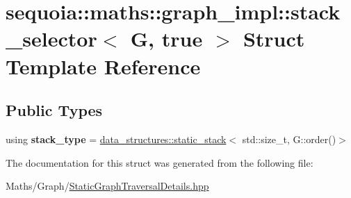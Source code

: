 \hypertarget{structsequoia_1_1maths_1_1graph__impl_1_1stack__selector_3_01_g_00_01true_01_4}{}\section{sequoia\+::maths\+::graph\+\_\+impl\+::stack\+\_\+selector$<$ G, true $>$ Struct Template Reference}
\label{structsequoia_1_1maths_1_1graph__impl_1_1stack__selector_3_01_g_00_01true_01_4}
\subsection*{Public Types}
\begin{DoxyCompactItemize}
\item 
\mbox{\label{structsequoia_1_1maths_1_1graph__impl_1_1stack__selector_3_01_g_00_01true_01_4_a93f63c8ebb739930ef7067ceec241a24}} 
using {\bfseries stack\+\_\+type} = \mbox{\hyperlink{classsequoia_1_1data__structures_1_1static__stack}{data\+\_\+structures\+::static\+\_\+stack}}$<$ std\+::size\+\_\+t, G\+::order()$>$
\end{DoxyCompactItemize}


The documentation for this struct was generated from the following file\+:\begin{DoxyCompactItemize}
\item 
Maths/\+Graph/\mbox{\hyperlink{_static_graph_traversal_details_8hpp}{Static\+Graph\+Traversal\+Details.\+hpp}}\end{DoxyCompactItemize}
